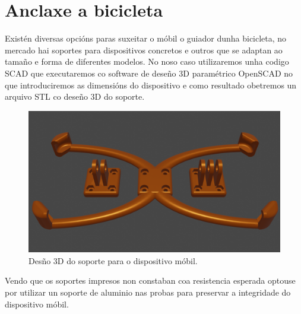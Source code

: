 \section{Anclaxe a bicicleta}
Existén diversas opcións paras suxeitar o móbil o guiador dunha bicicleta, no mercado hai soportes para dispositivos concretos e outros que se adaptan ao tamaño e forma de diferentes modelos. No noso caso utilizaremos unha codigo SCAD que executaremos co software de deseño 3D paramétrico OpenSCAD no que introduciremos as dimensións do dispositivo e como resultado obetremos un arquivo STL co deseño 3D do soporte.
\begin{figure}[tb]
  \centering
  \includegraphics[scale=.2]{imaxes/soporte-mobil.png}
  \caption{Desño 3D do soporte para o dispositivo móbil.}
  \label{f:soporte móbil}
\end{figure}
Vendo que os soportes impresos non constaban coa resistencia esperada optouse por utilizar un soporte de aluminio nas probas para preservar a integridade do dispositivo móbil.
